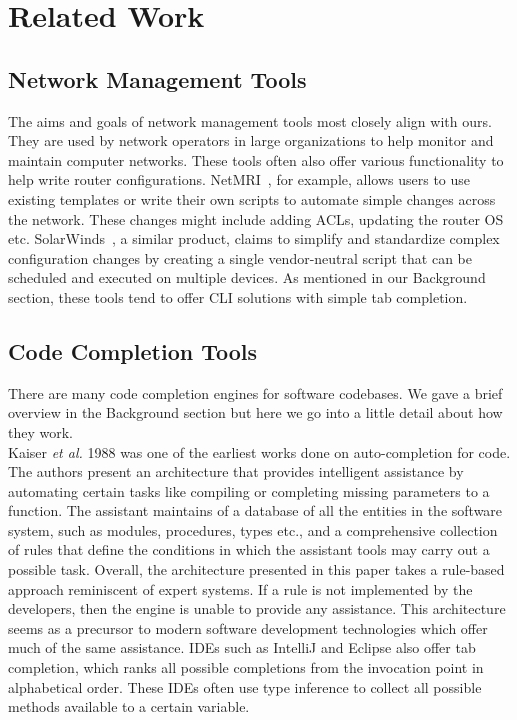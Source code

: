 \section{Related Work}

\subsection{Network Management Tools}
The aims and goals of network management tools most closely align with ours. They are used by network operators in large organizations to help monitor and maintain computer networks. These tools often also offer various functionality to help write router configurations. NetMRI~\cite{netmri}, for example, allows users to use existing templates or write their own scripts to automate simple changes across the network. These changes might include adding ACLs, updating the router OS etc. SolarWinds~\cite{solarwinds}, a similar product, claims to simplify and standardize complex configuration changes by creating a single vendor-neutral script that can be scheduled and executed on multiple devices. As mentioned in our Background section, these tools tend to offer CLI solutions with simple tab completion. 

\subsection{Code Completion Tools}
There are many code completion engines for software codebases. We gave a brief overview in the Background section but here we go into a little detail about how they work.\\

Kaiser \textit{et al.} 1988 was one of the earliest works done on auto-completion for code. The authors present an architecture that provides intelligent assistance by automating certain tasks like compiling or completing missing parameters to a function. The assistant maintains of a database of all the entities in the software system, such as modules, procedures, types etc., and a comprehensive collection of rules that define the conditions in which the assistant tools may carry out a possible task. Overall, the architecture presented in this paper takes a rule-based approach reminiscent of expert systems. If a rule is not implemented by the developers, then the engine is unable to provide any assistance. This architecture seems as a precursor to modern software development technologies which offer much of the same assistance. IDEs such as IntelliJ and Eclipse also offer tab completion, which ranks all possible completions from the invocation point in alphabetical order. These IDEs often use type inference to collect all possible methods available to a certain variable. \\

